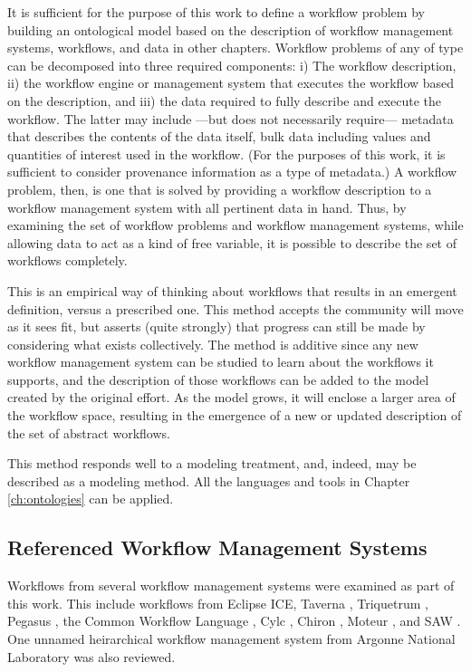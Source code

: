 It is sufficient for the purpose of this work to define a workflow problem
by building an ontological model based on the description of workflow
management systems, workflows, and data in other chapters. Workflow problems of
any of type can be decomposed into three required components: i) The workflow
description, ii) the workflow engine or management system that executes the
workflow based on the description, and iii) the data required to fully describe
and execute the workflow. The latter may include ---but does not necessarily
require--- metadata that describes the contents of the data itself, bulk data
including values and quantities of interest used in the workflow. (For the purposes of
this work, it is sufficient to consider provenance information as a type of
metadata.) A workflow problem, then, is one that is solved by providing a
workflow description to a workflow management system with all pertinent data in
hand. Thus, by examining the set of workflow problems and workflow management
systems, while allowing data to act as a kind of free variable, it is possible
to describe the set of workflows completely.

This is an empirical way of thinking about workflows that results in an emergent
definition, versus a prescribed one. This method accepts the community will
move as it sees fit, but asserts (quite strongly) that progress can still be
made by considering what exists collectively. The method is additive since
any new workflow management system can be studied to learn about the
workflows it supports, and the description of those workflows can be added to
the model created by the original effort. As the model grows, it will enclose a
larger area of the workflow space, resulting in the emergence of a new or
updated description of the set of abstract workflows.

This method responds well to a modeling treatment, and, indeed, may be described
as a modeling method. All the languages and tools in Chapter \ref{ch:ontologies}
can be applied.

\subsection{Referenced Workflow Management Systems}

Workflows from several workflow management systems were examined as part of this
work. This include workflows from Eclipse ICE, Taverna
\cite{wolstencroft_taverna_2013}, Triquetrum \cite{brooks_introducing_2016},
Pegasus \cite{noauthor_pegasus_nodate}, the Common Workflow Language
\cite{noauthor_common-workflow-language:_2018}, Cylc
\cite{noauthor_cylc_nodate}, Chiron \cite{ ogasawara_chiron:_nodate}, Moteur
\cite{glatard_flexible_2008}, and SAW \cite{clay_incorporating_2015}. One
unnamed heirarchical workflow management system from Argonne National
Laboratory was also reviewed.

